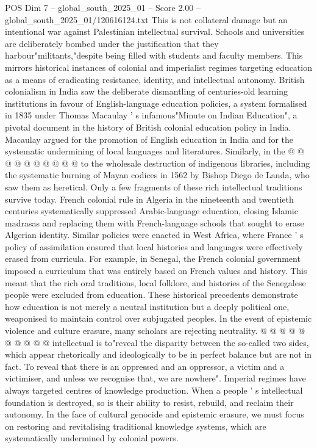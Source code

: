 \begin{textsample}{POS Dim 7 – global\_south\_2025\_01 – Score 2.00 – global\_south\_2025\_01/120616124.txt}
This is not collateral damage but an intentional war against Palestinian intellectual survival.
Schools and universities are deliberately bombed under the justification that they harbour"militants,"despite being filled with students and faculty members.
This mirrors historical instances of colonial and imperialist regimes targeting education as a means of eradicating resistance, identity, and intellectual autonomy.
British colonialism in India saw the deliberate dismantling of centuries-old learning institutions in favour of English-language education policies, a system formalised in 1835 under Thomas Macaulay ' s infamous"Minute on Indian Education", a pivotal document in the history of British colonial education policy in India.
Macaulay argued for the promotion of English education in India and for the systematic undermining of local languages and literatures.
Similarly, in the @ @ @ @ @ @ @ @ @ @ to the wholesale destruction of indigenous libraries, including the systematic burning of Mayan codices in 1562 by Bishop Diego de Landa, who saw them as heretical.
Only a few fragments of these rich intellectual traditions survive today.
French colonial rule in Algeria in the nineteenth and twentieth centuries systematically suppressed Arabic-language education, closing Islamic madrasas and replacing them with French-language schools that sought to erase Algerian identity.
Similar policies were enacted in West Africa, where France ' s policy of assimilation ensured that local histories and languages were effectively erased from curricula.
For example, in Senegal, the French colonial government imposed a curriculum that was entirely based on French values and history.
This meant that the rich oral traditions, local folklore, and histories of the Senegalese people were excluded from education.
These historical precedents demonstrate how education is not merely a neutral institution but a deeply political one, weaponised to maintain control over subjugated peoples.
In the event of epistemic violence and culture erasure, many scholars are rejecting neutrality. @ @ @ @ @ @ @ @ @ @ intellectual is to"reveal the disparity between the so-called two sides, which appear rhetorically and ideologically to be in perfect balance but are not in fact.
To reveal that there is an oppressed and an oppressor, a victim and a victimiser, and unless we recognise that, we are nowhere".
Imperial regimes have always targeted centres of knowledge production.
When a people ' s intellectual foundation is destroyed, so is their ability to resist, rebuild, and reclaim their autonomy.
In the face of cultural genocide and epistemic erasure, we must focus on restoring and revitalising traditional knowledge systems, which are systematically undermined by colonial powers.

\end{textsample}
